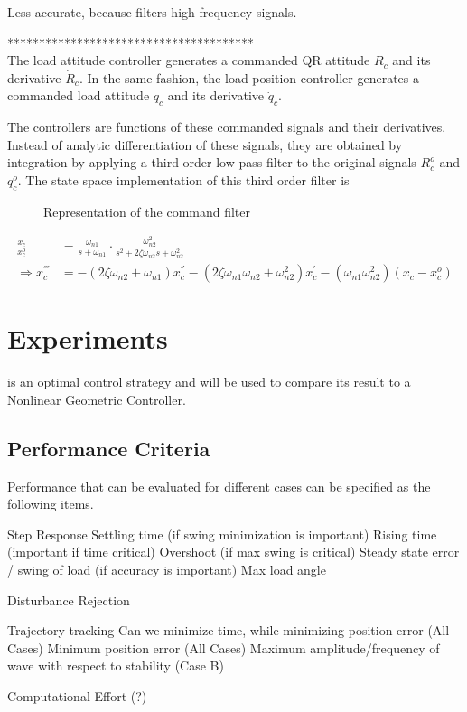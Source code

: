 Less accurate, because filters high frequency signals.

***************************************\\

The load attitude controller generates a commanded QR attitude $ R_c $ and its derivative $ \dot{R}_c $. In the same fashion, the load position controller generates a commanded load attitude $ q_c $ and its derivative $ \dot{q}_c $. 

The controllers are functions of these commanded signals and their derivatives. Instead of analytic differentiation of these signals, they are obtained by integration by applying a third order low pass filter to the original signals $ R_c^o $ and $ q_c^o $. 
The state space implementation of this third order filter is \cite{Djapic2008}


\begin{figure}[h!]
	\centering
	\caption{Representation of the command filter\label{fig:set.CF}}
\end{figure}		

\begin{align}\label{eq:CF}
\frac{x_c}{x_c^o}&=\frac{\omega_{n1}}{s+\omega_{n1}}\cdot\frac{\omega_{n2}^2}{s^2+2\zeta\omega_{n2}s+\omega_{n2}^2}\\
\Rightarrow x_c^{'''}&=-(2\zeta\omega_{n2}+\omega_{n1})x_c^{''}-(2\zeta\omega_{n1}\omega_{n2}+\omega_{n2}^2)x_c^{'}-(\omega_{n1}\omega_{n2} ^2)(x_c-x_c^o)
\end{align}

\section{Experiments}

 is an optimal control strategy and will be used to compare its result to a Nonlinear Geometric Controller.


\subsection{Performance Criteria}
Performance  that can be evaluated for different cases can be specified as the following items.
\begin{outline}
	\1 Step Response
	\2 Settling time (if swing minimization is important)
	\2 Rising time (important if time critical)
	\2 Overshoot (if max swing is critical)
	\2 Steady state error / swing of load (if accuracy is important)
	\2 Max load angle
	
	\1 Disturbance Rejection
	
	\1 Trajectory tracking
	\2 Can we minimize time, while minimizing position error (All Cases)
	\2 Minimum position error (All Cases)
	\2 Maximum amplitude/frequency of wave with respect to stability (Case B)
	
	\1 Computational Effort (?)
\end{outline}

